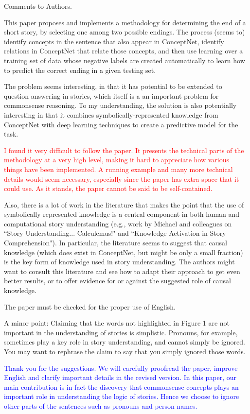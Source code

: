\documentclass{article}
\newcommand{\shanshan}[1]{\textcolor{blue}{ #1}}
\newcommand{\ssemp}[1]{\textcolor{red}{ #1}}
\begin{document}
Comments to Authors.

This paper proposes and implements a methodology for determining
the end of a short story, by selecting one among two possible
endings. The process (seems to) identify concepts in the sentence
that also appear in ConceptNet, identify relations in ConceptNet
that relate those concepts, and then use learning over a training
set of data whose negative labels are created automatically to
learn how to predict the correct ending in a given testing set.

The problem seems interesting, in that it has potential to be
extended to question answering in stories, which itself is a an
important problem for commonsense reasoning. To my understanding,
the solution is also potentially interesting in that it combines
symbolically-represented knowledge from ConceptNet with deep
learning techniques to create a predictive model for the task.

\ssemp{I found it very difficult to follow the paper. It presents the
technical parts of the methodology at a very high level, making it
hard to appreciate how various things have been implemented. A
running example and many more technical details would seem
necessary, especially since the paper has extra space that it could
use. As it stands, the paper cannot be said to be self-contained.}

Also, there is a lot of work in the literature that makes the point
that the use of symbolically-represented knowledge is a central
component in both human and computational story understanding
(e.g., work by Michael and colleagues on ``Story Understanding...
Calculemus!" and ``Knowledge Activation in Story Comprehension"). In
particular, the literature seems to suggest that causal knowledge
(which does exist in ConceptNet, but might be only a small
fraction) is the key form of knowledge used in story understanding.
The authors might want to consult this literature and see how to
adapt their approach to get even better results, or to offer
evidence for or against the suggested role of causal knowledge.

The paper must be checked for the proper use of English.

A minor point: Claiming that the words not highlighted in Figure 1
are not important in the understanding of stories is simplistic.
Pronouns, for example, sometimes play a key role in story
understanding, and cannot simply be ignored. You may want to
rephrase the claim to say that you simply ignored those words.

\shanshan{Thank you for the suggestions. We will carefully proofread the 
paper, improve English and clarify important details in the revised version.
In this paper, our main contribution is in fact the discovery 
that commonsense concepts plays an important role in understanding 
the logic of stories. Hence we choose to ignore other parts of 
the sentences such as pronouns and person names.}
		
\end{document}
